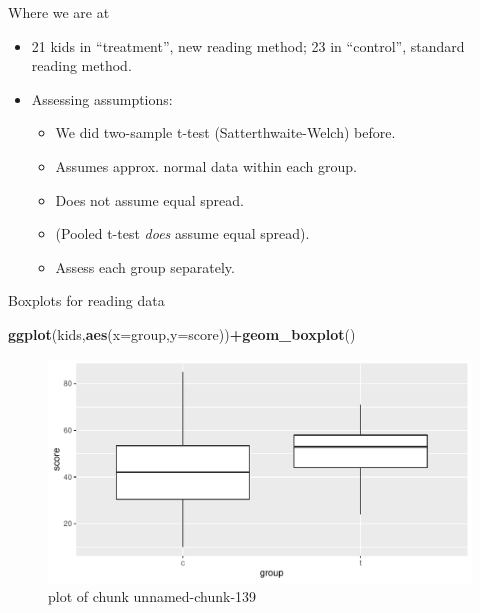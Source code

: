 \documentclass[ignorenonframetext,]{beamer}
\newenvironment{Shaded}{\begin{snugshade}}{\end{snugshade}}
\newcommand{\DataTypeTok}[1]{\textcolor[rgb]{0.13,0.29,0.53}{#1}}
\newcommand{\KeywordTok}[1]{\textcolor[rgb]{0.13,0.29,0.53}{\textbf{#1}}}
\newcommand{\NormalTok}[1]{#1}
\newcommand{\OperatorTok}[1]{\textcolor[rgb]{0.81,0.36,0.00}{\textbf{#1}}}
\providecommand{\tightlist}{%
  \setlength{\itemsep}{0pt}\setlength{\parskip}{0pt}}
\begin{document}
\begin{frame}{Where we are at}
\protect\hypertarget{where-we-are-at}{}

\begin{itemize}
\item
  21 kids in ``treatment'', new reading method; 23 in ``control'',
  standard reading method.
\item
  Assessing assumptions:

  \begin{itemize}
  \tightlist
  \item
    We did two-sample t-test (Satterthwaite-Welch) before.
  \item
    Assumes approx. normal data within each group.
  \item
    Does not assume equal spread.
  \item
    (Pooled t-test \emph{does} assume equal spread).
  \item
    Assess each group separately.
  \end{itemize}
\end{itemize}

\end{frame}

\begin{frame}[fragile]{Boxplots for reading data}
\protect\hypertarget{boxplots-for-reading-data}{}

\begin{Shaded}
\begin{Highlighting}[]
\KeywordTok{ggplot}\NormalTok{(kids,}\KeywordTok{aes}\NormalTok{(}\DataTypeTok{x=}\NormalTok{group,}\DataTypeTok{y=}\NormalTok{score))}\OperatorTok{+}\KeywordTok{geom_boxplot}\NormalTok{()}
\end{Highlighting}
\end{Shaded}

\begin{figure}
\centering
\includegraphics{figure/unnamed-chunk-139-1.pdf}
\caption{plot of chunk unnamed-chunk-139}
\end{figure}

\end{frame}
\end{document}
